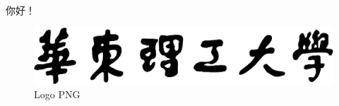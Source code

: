 \documentclass{ecust_thesis}
\begin{document}
你好！
\begin{figure}[!hbp]
  \center\includegraphics[width=\textwidth]{img/ecust_words_logo_png}
  \caption{Logo PNG} \label{logo_png}
\end{figure}
\end{document}
